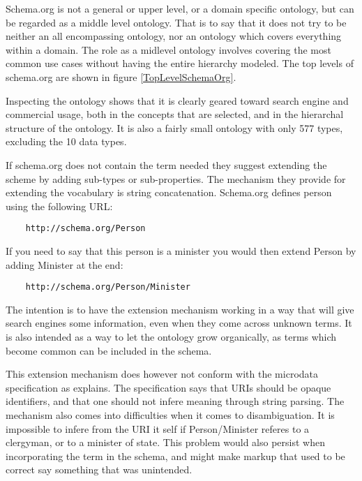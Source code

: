 Schema.org is not a general or upper level, or a domain specific ontology,
but can be regarded as a middle level ontology.
That is to say that it does not try to be neither an all encompassing ontology,
nor an ontology which covers everything within a domain.
The role as a midlevel ontology involves covering the most common use cases without having the entire hierarchy modeled.
The top levels of schema.org are shown in figure \ref{TopLevelSchemaOrg}.


Inspecting the ontology shows that it is clearly geared toward search engine and commercial usage,
both in the concepts that are selected, and in the hierarchal structure of the ontology\citep{Ronallo2012}.
It is also a fairly small ontology with only 577 types, excluding the 10 data types.

If schema.org does not contain the term needed they suggest extending the scheme by adding sub-types or sub-properties.
The mechanism they provide for extending the vocabulary is string concatenation.
Schema.org defines person using the following URL:
\begin{verbatim}
	http://schema.org/Person
\end{verbatim}
If you need to say that this person is a minister you would then extend Person by adding Minister at the end:
\begin{verbatim}
	http://schema.org/Person/Minister
\end{verbatim}
The intention is to have the extension mechanism working in a way that will give search engines some information,
even when they come across unknown terms.
It is also intended as a way to let the ontology grow organically,
as terms which become common can be included in the schema.

This extension mechanism does however not conform with the microdata specification as \citet{Tennison2011} explains.
The specification says that URIs should be opaque identifiers,
and that one should not infere meaning through string parsing.
The mechanism also comes into difficulties when it comes to disambiguation.
It is impossible to infere from the URI it self if Person/Minister referes to a clergyman, or to a minister of state.
This problem would also persist when incorporating the term in the schema,
and might make markup that used to be correct say something that was unintended.


